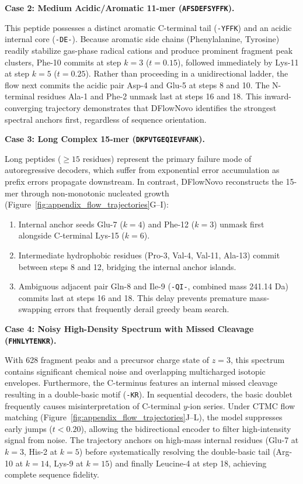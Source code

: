 \noindent\textbf{Case 2: Medium Acidic/Aromatic 11-mer (\texttt{AFSDEFSYFFK}).}\par\vspace{2pt}
This peptide possesses a distinct aromatic C-terminal tail (\texttt{-YFFK}) and an acidic internal core (\texttt{-DE-}). Because aromatic side chains (Phenylalanine, Tyrosine) readily stabilize gas-phase radical cations and produce prominent fragment peak clusters, Phe-10 commits at step $k=3$ ($t=0.15$), followed immediately by Lys-11 at step $k=5$ ($t=0.25$). Rather than proceeding in a unidirectional ladder, the flow next commits the acidic pair Asp-4 and Glu-5 at steps 8 and 10. The N-terminal residues Ala-1 and Phe-2 unmask last at steps 16 and 18. This inward-converging trajectory demonstrates that DFlowNovo identifies the strongest spectral anchors first, regardless of sequence orientation.

\noindent\textbf{Case 3: Long Complex 15-mer (\texttt{DKPVTGEQIEVFANK}).}\par\vspace{2pt}
Long peptides ($\ge 15$ residues) represent the primary failure mode of autoregressive decoders, which suffer from exponential error accumulation as prefix errors propagate downstream. In contrast, DFlowNovo reconstructs the 15-mer through non-monotonic nucleated growth (Figure~\ref{fig:appendix_flow_trajectories}G--I):
\begin{enumerate}
\item Internal anchor seeds Glu-7 ($k=4$) and Phe-12 ($k=3$) unmask first alongside C-terminal Lys-15 ($k=6$).
\item Intermediate hydrophobic residues (Pro-3, Val-4, Val-11, Ala-13) commit between steps 8 and 12, bridging the internal anchor islands.
\item Ambiguous adjacent pair Gln-8 and Ile-9 (\texttt{-QI-}, combined mass 241.14 Da) commits last at steps 16 and 18. This delay prevents premature mass-swapping errors that frequently derail greedy beam search.
\end{enumerate}

\noindent\textbf{Case 4: Noisy High-Density Spectrum with Missed Cleavage (\texttt{FHNLYTENKR}).}\par\vspace{2pt}
With 628 fragment peaks and a precursor charge state of $z=3$, this spectrum contains significant chemical noise and overlapping multicharged isotopic envelopes. Furthermore, the C-terminus features an internal missed cleavage resulting in a double-basic motif (\texttt{-KR}). In sequential decoders, the basic doublet frequently causes misinterpretation of C-terminal $y$-ion series. Under CTMC flow matching (Figure~\ref{fig:appendix_flow_trajectories}J--L), the model suppresses early jumps ($t < 0.20$), allowing the bidirectional encoder to filter high-intensity signal from noise. The trajectory anchors on high-mass internal residues (Glu-7 at $k=3$, His-2 at $k=5$) before systematically resolving the double-basic tail (Arg-10 at $k=14$, Lys-9 at $k=15$) and finally Leucine-4 at step 18, achieving complete sequence fidelity.

